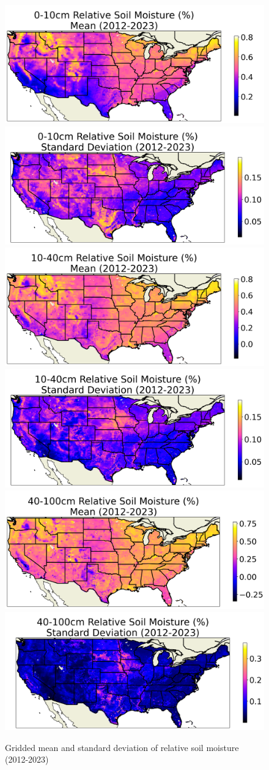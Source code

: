 \begin{figure}[h!]
    \centering
    \includegraphics[width=.48\linewidth]{figures/thesis-gridstats/gridstat-bulk_rsm-10_2012-1_2023-12_y000-195_x000-462_mean.png}
    \includegraphics[width=.48\linewidth]{figures/thesis-gridstats/gridstat-bulk_rsm-10_2012-1_2023-12_y000-195_x000-462_stdev.png}
    \includegraphics[width=.48\linewidth]{figures/thesis-gridstats/gridstat-bulk_rsm-40_2012-1_2023-12_y000-195_x000-462_mean.png}
    \includegraphics[width=.48\linewidth]{figures/thesis-gridstats/gridstat-bulk_rsm-40_2012-1_2023-12_y000-195_x000-462_stdev.png}
    \includegraphics[width=.48\linewidth]{figures/thesis-gridstats/gridstat-bulk_rsm-100_2012-1_2023-12_y000-195_x000-462_mean.png}
    \includegraphics[width=.48\linewidth]{figures/thesis-gridstats/gridstat-bulk_rsm-100_2012-1_2023-12_y000-195_x000-462_stdev.png}
    \caption{Gridded mean and standard deviation of relative soil moisture (2012-2023)}
    \label{gs-rsm}
\end{figure}

